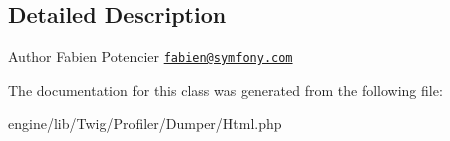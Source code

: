 \subsection{Detailed Description}
\begin{DoxyAuthor}{Author}
Fabien Potencier \href{mailto:fabien@symfony.com}{\tt fabien@symfony.\+com} 
\end{DoxyAuthor}


The documentation for this class was generated from the following file\+:\begin{DoxyCompactItemize}
\item 
engine/lib/\+Twig/\+Profiler/\+Dumper/Html.\+php\end{DoxyCompactItemize}
